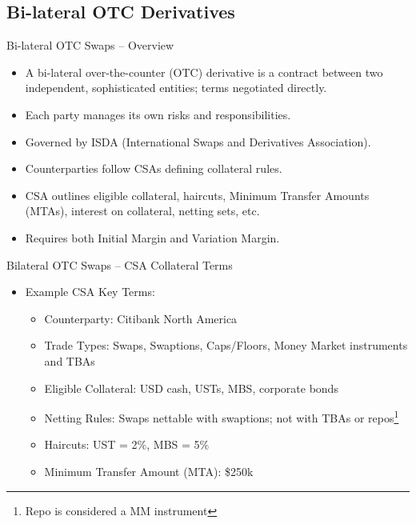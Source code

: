 \documentclass[handout, aspectratio=169]{beamer}
\begin{document}
\subsection{Bi-lateral OTC Derivatives}
\begin{frame}{Bi-lateral OTC Swaps – Overview}
  \begin{itemize}
    \item A bi-lateral over-the-counter (OTC) derivative is a contract between two independent, sophisticated entities; terms negotiated directly. 
    \item Each party manages its own risks and responsibilities.
    \item Governed by ISDA (International Swaps and Derivatives Association).
    \item Counterparties follow CSAs defining collateral rules.
    \item CSA outlines eligible collateral, haircuts, Minimum Transfer Amounts (MTAs), interest on collateral, netting sets, etc.
    \item Requires both Initial Margin and Variation Margin.
  \end{itemize}
\end{frame}

\begin{frame}{Bilateral OTC Swaps – CSA Collateral Terms}
  \begin{itemize}
    \item Example CSA Key Terms:
    \begin{itemize}
      \item Counterparty: Citibank North America
      \item Trade Types: Swaps, Swaptions, Caps/Floors, Money Market instruments and TBAs
      \item Eligible Collateral: USD cash, USTs, MBS, corporate bonds
      \item Netting Rules: Swaps nettable with swaptions; not with TBAs or repos\footnote{Repo is considered a MM instrument}
      \item Haircuts: UST = 2\%, MBS = 5\%
      \item Minimum Transfer Amount (MTA): \$250k
    \end{itemize}
  \end{itemize}
\end{frame}
\end{document}
